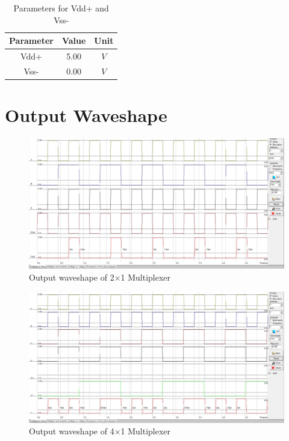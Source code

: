 \documentclass[a4paper,12pt]{article}
\begin{document}
		
		\begin{table}[H]
			\centering
			\caption{Parameters for Vdd+ and Vss- }
			\begin{tabular}{|c|c|c|}
				\hline
				\textbf{Parameter} & \textbf{Value} & \textbf{Unit} \\ \hline
				Vdd+               & 5.00           & $V $            \\ \hline
				Vss-               & 0.00           & $V$             \\ \hline
			\end{tabular}
			
		\end{table}
	\newpage
	
	
	
	\section{Output Waveshape }
	\begin{figure}[H]
		\centering
		\includegraphics[width=1\linewidth, height=.4\textheight]{Images/2}
		\caption{Output waveshape of 2$\times$1 Multiplexer}
		\label{fig:1}
	\end{figure}
	\begin{figure}[H]
		\centering
	\includegraphics[width=1\linewidth, height=.4\textheight]{Images/4}
		\caption{Output waveshape of 4$\times$1 Multiplexer}
		\label{fig:1}
	\end{figure}
\end{document}
